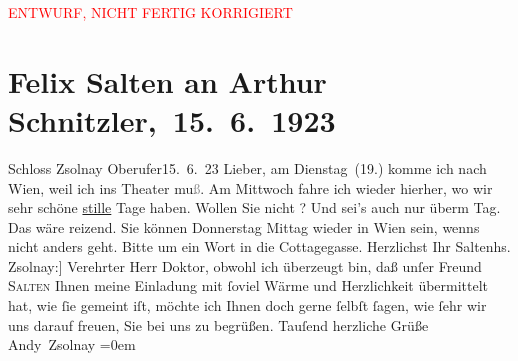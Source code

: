 
\begin{center}
            \textcolor{red}{ENTWURF, NICHT FERTIG KORRIGIERT}
                      \end{center}
            
         
         \renewcommand{\erwaehntePersonen}{Personen: Frieda Pollak}
         \renewcommand{\erwaehnteOrte}{Orte: Cottagegasse, Prievoz, Schloss Csáky, Wien}
         \renewcommand{\erwaehnteWerke}{}
               \section[ Felix Salten an Arthur Schnitzler, 15. 6. 1923]{ Felix Salten an Arthur Schnitzler, 15. 6. 1923}\nopagebreak{}\rehead{ }\begin{ledgroupsized}[t]{13cm}\normalsize\beginnumbering \toendnotes[C]{\smallbreak\pagebreak[2]} 
\toendnotes[C]{\smallbreak}\pstart
           \noindent{}\centering{}{\pb}{[}Schloss Zsolnay\oindex{Schloss Csáky@\textbf{Schloss Csáky}|pw}{]}\pend
           \pstart
           \raggedleft{}{\pb}Oberufer15. 6. 23\pend
           \pstart{}Lieber,\pend\pstart
           am Dienstag (19.) komme ich nach Wien, weil ich ins Theater mu\textcolor{gray}{ß}. Am Mittwoch fahre ich wieder hierher, wo wir sehr schöne \uline{stille} Tage haben. Wollen Sie nicht \label{K_L02793-1v}\label{K_L02793-1h}?
               Und sei’s auch nur überm Tag. Das wäre reizend. Sie können Donnerstag{ }Mittag wieder in Wien sein, wenns
               nicht anders geht. Bitte um ein Wort in die Cottagegasse.\pend
           \pstart Herzlichst Ihr \spacefill\mbox{Salten}\pend{}{\bigskip}\pstart{}{[}hs. Zsolnay:{]} Verehrter Herr Doktor,\pend\pstart
           obwohl ich überzeugt bin, daß unſer Freund \textsc{Salten} Ihnen
               meine Einladung mit ſoviel Wärme und Herzlichkeit übermittelt hat, wie ſie gemeint
               iſt, möchte ich Ihnen doch gerne ſelbſt ſagen, wie ſehr {\pb}wir uns darauf freuen, Sie bei
               uns zu begrüßen.\pend
           \pstart
           Tauſend herzliche Grüße {\\[\baselineskip]}\spacefill\mbox{Andy Zsolnay}\pend
           \leftskip=0em{}
         

\end{ledgroupsized}
